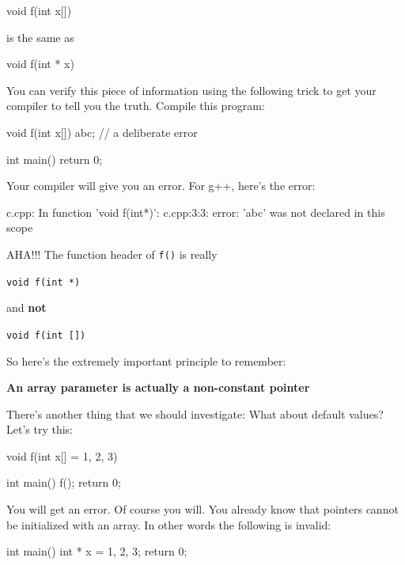 \begin{consolethree}[escapeinside=||]
void f(int x[])
{}
\end{consolethree}

is the same as

\begin{consolethree}[escapeinside=||]
void f(int * x)
{}
\end{consolethree}

You can verify this piece of information using the following trick to
get your compiler to tell you the truth. Compile this program:

\begin{consolethree}[escapeinside=||]
void f(int x[])
{
    abc; // a deliberate error
}

int main()
{
    return 0;
}
\end{consolethree}

Your compiler will give you an error. For g++, here's
the error:

\begin{consolethree}[escapeinside=||]
c.cpp: In function 'void f(int*)':
c.cpp:3:3: error: 'abc' was not declared in this scope
\end{consolethree}

AHA!!! The function header of \texttt{f()} is really

\verb!void f(int *)!

and \textbf{not}

\verb!void f(int [])!

So here's the extremely important principle to remember:

\textbf{An array parameter is actually a non-constant pointer}


\newpage{}

There's another thing that we should investigate: What
about default values? Let's try this:

\begin{consolethree}[escapeinside=||]
void f(int x[] = {1, 2, 3})
{}

int main()
{
    f();
    return 0;
}
\end{consolethree}

You will get an error. Of course you will. You already know that
pointers cannot be initialized with an array. In other words the
following is invalid:

\begin{consolethree}[escapeinside=||]
int main()
{
    int * x = {1, 2, 3};
    return 0;
}
\end{consolethree}


